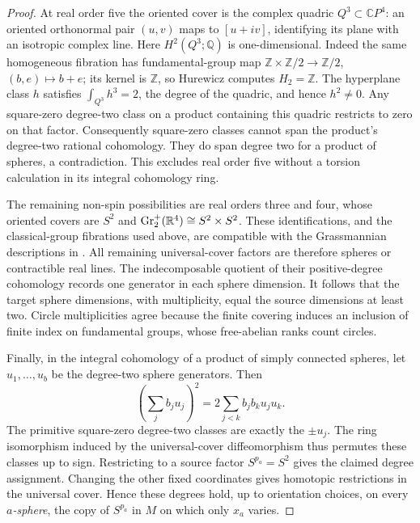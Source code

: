 \begin{proof}
At real order five the oriented cover is the complex quadric
$Q^3\subset\mathbb CP^4$: an oriented orthonormal pair $(u,v)$ maps
to $[u+iv]$, identifying its plane with an isotropic complex line.
Here $H^2(Q^3;\mathbb Q)$ is one-dimensional. Indeed the same homogeneous
fibration has fundamental-group map
$\mathbb Z\times\mathbb Z/2\to\mathbb Z/2$, $(b,e)\mapsto b+e$;
its kernel is $\mathbb Z$, so Hurewicz computes $H_2=\mathbb Z$.
The hyperplane class $h$ satisfies $\int_{Q^3}h^3=2$, the degree of the
quadric, and hence $h^2\ne0$. Any square-zero degree-two class on a
product containing this quadric restricts to zero on that factor.
Consequently square-zero classes cannot span the product's degree-two
rational cohomology. They do span degree two for a product of spheres,
a contradiction. This excludes real order five without a torsion
calculation in its integral cohomology ring.

The remaining non-spin possibilities are real orders three and four,
whose oriented covers are $S^2$ and
$\operatorname{Gr}_2^+(\mathbb R^4)\cong S^2\times S^2$.
These identifications, and the classical-group fibrations used above,
are compatible with the Grassmannian descriptions in
\cite[Examples~4.53--4.55]{Hatcher2002}. All remaining universal-cover
factors are therefore spheres or contractible real lines. The
indecomposable quotient of their positive-degree cohomology records
one generator in each sphere dimension. It follows that the target
sphere dimensions, with multiplicity, equal the source dimensions at
least two. Circle multiplicities agree because the finite covering
induces an inclusion of finite index on fundamental groups, whose
free-abelian ranks count circles.

Finally, in the integral cohomology of a product of simply connected
spheres, let $u_1,\ldots,u_b$ be the degree-two sphere generators. Then
\[
 \left(\sum_j b_ju_j\right)^2
   =2\sum_{j<k}b_jb_k u_ju_k.
\]
The primitive square-zero degree-two classes are exactly the $\pm u_j$.
The ring isomorphism induced by the universal-cover diffeomorphism thus
permutes these classes up to sign. Restricting to a source factor
$S^{p_a}=S^2$ gives the claimed degree assignment.
Changing the other fixed coordinates gives homotopic restrictions in the
universal cover. Hence these degrees hold, up to orientation choices, on
every \emph{$a$-sphere}, the copy of $S^{p_a}$ in $M$ on which only
$x_a$ varies.
\end{proof}

